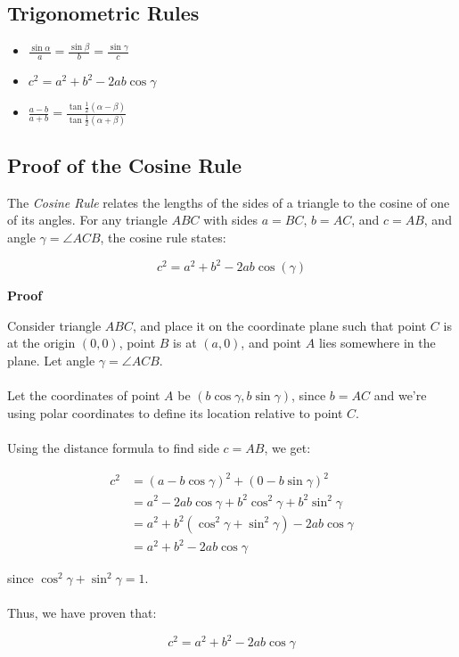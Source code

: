 \subsection{Trigonometric Rules}

\begin{itemize}[label =\(-\)]
	\item \(\frac{\sin \alpha}{a} = \frac{\sin \beta}{b} = \frac{\sin \gamma}{c}\)
	\item \(c^2 = a^2 + b^2 - 2ab \cos \gamma\)
	\item \(\frac{a - b}{a + b} = \frac{\tan \frac{1}{2}(\alpha - \beta)}{\tan \frac{1}{2} (\alpha + \beta)}\)
\end{itemize}

\subsection{Proof of the Cosine Rule}

The \emph{Cosine Rule} relates the lengths of the sides of a triangle to the cosine of one of its angles. For any triangle \( ABC \) with sides \( a = BC \), \( b = AC \), and \( c = AB \), and angle \( \gamma = \angle ACB \), the cosine rule states:

\[
c^2 = a^2 + b^2 - 2ab\cos(\gamma)
\]

\textbf{Proof}

Consider triangle \( ABC \), and place it on the coordinate plane such that point \( C \) is at the origin \( (0,0) \), point \( B \) is at \( (a,0) \), and point \( A \) 
lies somewhere in the plane. Let angle \( \gamma = \angle ACB \).
\\\\
Let the coordinates of point \( A \) be \( (b\cos\gamma, b\sin\gamma) \), since \( b = AC \) and we’re using polar coordinates to define its location relative to point \( C \).
\\\\
Using the distance formula to find side \( c = AB \), we get:

\begin{align*}
c^2 &= (a - b\cos\gamma)^2 + (0 - b\sin\gamma)^2 \\
&= a^2 - 2ab\cos\gamma + b^2\cos^2\gamma + b^2\sin^2\gamma \\
&= a^2 + b^2(\cos^2\gamma + \sin^2\gamma) - 2ab\cos\gamma \\
&= a^2 + b^2 - 2ab\cos\gamma
\end{align*}

since \( \cos^2\gamma + \sin^2\gamma = 1 \).
\\\\
Thus, we have proven that:

\[
c^2 = a^2 + b^2 - 2ab\cos\gamma
\]

\QED